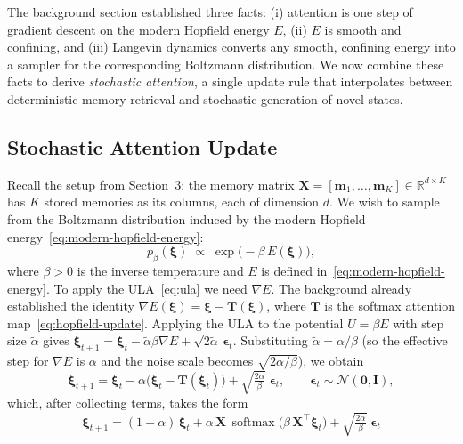 
The background section established three facts: (i) attention is one step of gradient descent on the modern Hopfield energy $E$, (ii) $E$ is smooth and confining, and (iii) Langevin dynamics converts any smooth, confining energy into a sampler for the corresponding Boltzmann distribution. We now combine these facts to derive \emph{stochastic attention}, a single update rule that interpolates between deterministic memory retrieval and stochastic generation of novel states.

\subsection{Stochastic Attention Update}
Recall the setup from Section~3: the memory matrix $\mathbf{X}=[\mathbf{m}_1,\dots,\mathbf{m}_K]\in\mathbb{R}^{d\times K}$ has $K$ stored memories as its columns, each of dimension $d$. We wish to sample from the Boltzmann distribution induced by the modern Hopfield energy~\eqref{eq:modern-hopfield-energy}:
\begin{equation}\label{eq:boltzmann-hopfield}
    p_\beta(\boldsymbol{\xi})
    \;\propto\; \exp\!\bigl(-\beta\, E(\boldsymbol{\xi})\bigr),
\end{equation}
where $\beta>0$ is the inverse temperature and $E$ is defined in~\eqref{eq:modern-hopfield-energy}. To apply the ULA~\eqref{eq:ula} we need $\nabla E$. The background already established the identity $\nabla E(\boldsymbol{\xi})=\boldsymbol{\xi}-\mathbf{T}(\boldsymbol{\xi})$, where $\mathbf{T}$ is the softmax attention map~\eqref{eq:hopfield-update}. Applying the ULA to the potential $U=\beta E$ with step size $\tilde\alpha$ gives $\boldsymbol{\xi}_{t+1}=\boldsymbol{\xi}_t-\tilde\alpha\beta\nabla E+\sqrt{2\tilde\alpha}\,\boldsymbol{\epsilon}_t$. Substituting $\tilde\alpha=\alpha/\beta$ (so the effective step for $\nabla E$ is $\alpha$ and the noise scale becomes $\sqrt{2\alpha/\beta}$), we obtain
\begin{equation}\label{eq:stochastic-attention}
    \boldsymbol{\xi}_{t+1}
    = \boldsymbol{\xi}_t
      - \alpha\bigl(\boldsymbol{\xi}_t - \mathbf{T}(\boldsymbol{\xi}_t)\bigr)
      + \sqrt{\tfrac{2\alpha}{\beta}}\;\boldsymbol{\epsilon}_t,
    \qquad \boldsymbol{\epsilon}_t\sim\mathcal{N}(\mathbf{0},\mathbf{I}),
\end{equation}
which, after collecting terms, takes the form
\begin{equation}\label{eq:stochastic-attention-expanded}
    \boxed{\;
    \boldsymbol{\xi}_{t+1}
    = (1-\alpha)\,\boldsymbol{\xi}_t
      + \alpha\,\mathbf{X}\,\operatorname{softmax}\!\bigl(\beta\,\mathbf{X}^{\top}\boldsymbol{\xi}_t\bigr)
      + \sqrt{\tfrac{2\alpha}{\beta}}\;\boldsymbol{\epsilon}_t
    \;}
\end{equation}
